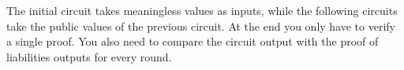The initial circuit takes meaningless values as inputs, while the following circuits take the public values of the previous circuit.
At the end you only have to verify a single proof. You also need to compare the circuit output with the proof of liabilities outputs for every round.

